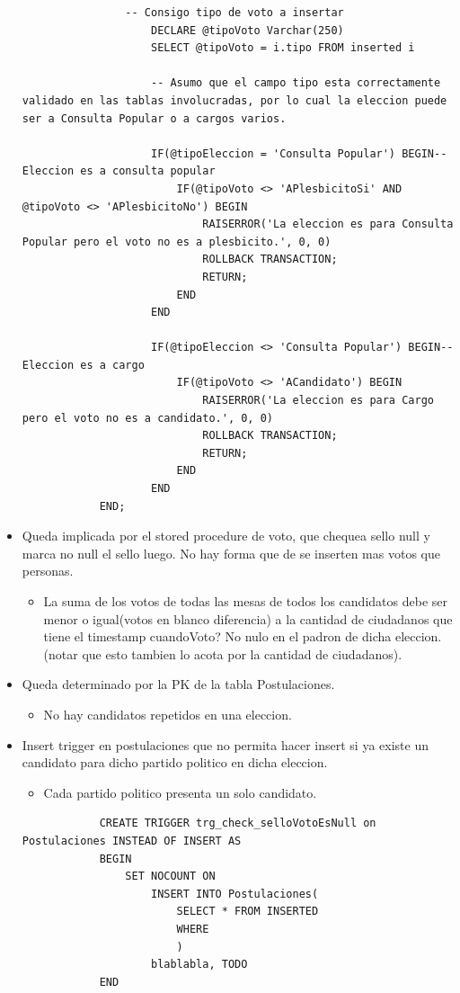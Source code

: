 \begin{itemize}
\begin{lstlisting}
				-- Consigo tipo de voto a insertar
					DECLARE @tipoVoto Varchar(250)
					SELECT @tipoVoto = i.tipo FROM inserted i
					
					-- Asumo que el campo tipo esta correctamente validado en las tablas involucradas, por lo cual la eleccion puede ser a Consulta Popular o a cargos varios.
					
					IF(@tipoEleccion = 'Consulta Popular') BEGIN-- Eleccion es a consulta popular
						IF(@tipoVoto <> 'APlesbicitoSi' AND @tipoVoto <> 'APlesbicitoNo') BEGIN
							RAISERROR('La eleccion es para Consulta Popular pero el voto no es a plesbicito.', 0, 0)
							ROLLBACK TRANSACTION;
							RETURN;
						END
					END
					
					IF(@tipoEleccion <> 'Consulta Popular') BEGIN-- Eleccion es a cargo
						IF(@tipoVoto <> 'ACandidato') BEGIN
							RAISERROR('La eleccion es para Cargo pero el voto no es a candidato.', 0, 0)
							ROLLBACK TRANSACTION;
							RETURN;
						END
					END
			END;
		\end{lstlisting}
	
	\item{Queda implicada por el stored procedure de voto, que chequea sello null y marca no null el sello luego. No hay forma que de se inserten mas votos que personas}. 
		\begin{itemize}
			\item La suma de los votos de todas las mesas de todos los candidatos debe ser menor o igual(votos en blanco diferencia) a la cantidad de ciudadanos que tiene el timestamp cuandoVoto? No nulo en el padron de dicha eleccion. (notar que esto tambien lo acota por la cantidad de ciudadanos). 
		\end{itemize}

	\item Queda determinado por la PK de la tabla Postulaciones.
		\begin{itemize}
			\item No hay candidatos repetidos en una eleccion.
		\end{itemize}

	\item Insert trigger en postulaciones que no permita hacer insert si ya existe un candidato para dicho partido politico en dicha eleccion.
		\begin{itemize}
			\item Cada partido politico presenta un solo candidato.
		\end{itemize}
		\begin{lstlisting}
			CREATE TRIGGER trg_check_selloVotoEsNull on Postulaciones INSTEAD OF INSERT AS 
			BEGIN
				SET NOCOUNT ON
					INSERT INTO Postulaciones(
						SELECT * FROM INSERTED
						WHERE 
						)
					blablabla, TODO
			END
		\end{lstlisting}
	

\end{itemize}
